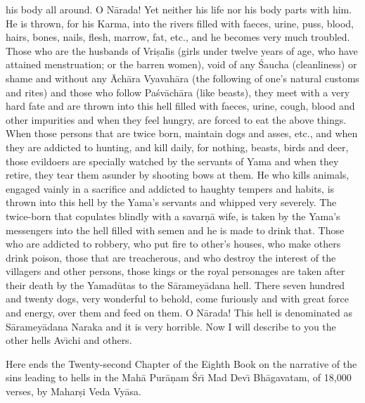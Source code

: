 his body all around. O N\=arada! Yet neither his life nor his body parts with him. He is thrown, for his Karma, into the rivers filled with faeces, urine, puss, blood, hairs, bones, nails, flesh, marrow, fat, etc., and he becomes very much troubled. Those who are the husbands of Vri\d{s}al\={\i}s (girls under twelve years of age, who have attained menstruation; or the barren women), void of any \'Saucha (cleanliness) or shame and without any \=Ach\=ara Vyavah\=ara (the following of one's natural customs and rites) and those who follow Pa\'sv\=ach\=ara (like beasts), they meet with a very hard fate and are thrown into this hell filled with faeces, urine, cough, blood and other impurities and when they feel hungry, are forced to eat the above things. When those persons that are twice born, maintain dogs and asses, etc., and when they are addicted to hunting, and kill daily, for nothing, beasts, birds and deer, those evildoers are specially watched by the servants of Yama and when they retire, they tear them asunder by shooting bows at them. He who kills animals, engaged vainly in a sacrifice and addicted to haughty tempers and habits, is thrown into this hell by the Yama's servants and whipped very severely. The twice-born that copulates blindly with a savar\d{n}\=a wife, is taken by the Yama's messengers into the hell filled with semen and he is made to drink that. Those who are addicted to robbery, who put fire to other's houses, who make others drink poison, those that are treacherous, and who destroy the interest of the villagers and other persons, those kings or the royal personages are taken after their death by the Yamad\=utas to the S\=aramey\=adana hell. There seven hundred and twenty dogs, very wonderful to behold, come furiously and with great force and energy, over them and feed on them. O N\=arada! This hell is denominated as S\=aramey\=adana Naraka and it is very horrible. Now I will describe to you the other hells Av\={\i}chi and others.

Here ends the Twenty-second Chapter of the Eighth Book on the narrative of the sins leading to hells in the Mah\=a Pur\=a\d{n}am \'Sr\={\i} Mad Dev\={\i} Bh\=agavatam, of 18,000 verses, by Mahar\d{s}i Veda Vy\=asa.



